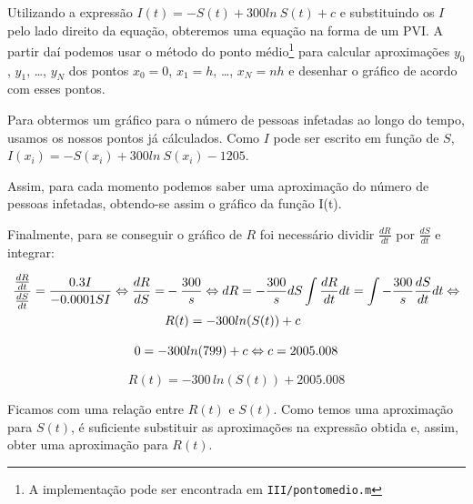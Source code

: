 \documentclass[portuguese, a4paper]{article}
\newcommand\tu[0]{\textunderscore}
\newcommand\eq[0]{\Leftrightarrow}
\begin{document}
		\subsubsection{} \label{sec:III.2c)}
		\par
		Utilizando a expressão $I(t) = -S(t) + 300ln~S(t) + c$ e substituindo
		os $I$ pelo lado direito da equação, obteremos uma equação na forma de
		um PVI\@. A partir daí podemos usar o método do ponto médio\footnote{A
		implementação pode ser encontrada em \texttt{III/ponto\tu medio.m}}
		para calcular aproximações $y_0$, $y_1$, \ldots, $y_N$ dos pontos $x_0
		= 0$, $x_1 = h$, \ldots, $x_N = nh$ e desenhar o gráfico de acordo
		com esses pontos.

		\par
		Para obtermos um gráfico para o número de pessoas infetadas ao longo do
		tempo, usamos os nossos pontos já cálculados. Como $I$ pode ser escrito
		em função de $S$, $I(x_i) = -S(x_i) + 300ln~S(x_i) - 1205$.

		\par
		Assim, para cada momento podemos saber uma aproximação do número de
		pessoas infetadas, obtendo-se assim	o gráfico da função I(t).

		\par \null \par
		Finalmente, para se conseguir o gráfico de $R$ foi necessário
		dividir $\frac{dR}{dt}$ por $\frac{dS}{dt}$ e integrar:

		\begin{equation}
		\begin{split}
			\frac{\frac{dR}{dt}}{\frac{dS}{dt}} = \frac{0.3 I}{-0.0001 S I}
			\eq
			\frac{dR}{dS} = &-\frac{300}{s} \eq dR =
			-\frac{300}{s} dS
			\int \frac{dR}{dt}dt = \int -\frac{300}{s} \frac{dS}{dt}dt
			\eq \\ \newline
			& R(t) = -300 ln(S(t)) + c
		\end{split}
		\end{equation}

		\begin{equation}
			0 = -300 ln(799) + c \eq \\
			c = 2005.008 \\
		\end{equation}

		\begin{equation}
			R(t) = -300\, ln(S(t)) + 2005.008
		\end{equation}

		\par
		Ficamos com uma relação entre $R(t)$ e $S(t)$. Como temos uma
		aproximação para $S(t)$, é suficiente substituir as aproximações na
		expressão obtida e, assim, obter uma aproximação para $R(t)$.
\end{document}
